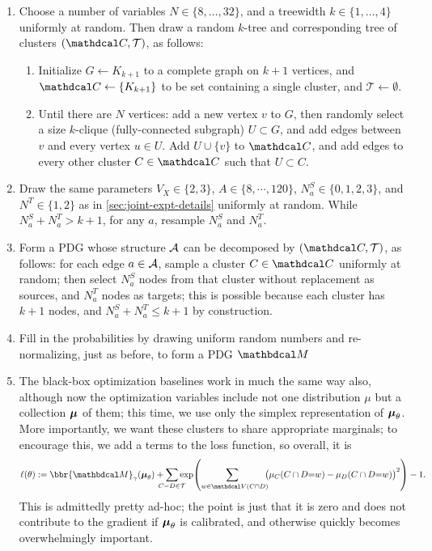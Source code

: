 \begin{subappendices}
\begin{enumerate}
    \item Choose a number of variables $N \in \{ 8, \ldots, 32 \}$, and a treewidth $k \in \{1, \ldots, 4\}$ uniformly at random.
    Then draw a random $k$-tree and corresponding tree of clusters $(\C, \mathcal T)$, as follows:
    \begin{enumerate}
        \item Initialize $G \gets K_{k+1}$ to a complete graph on $k+1$ vertices, and $\C \gets\{ K_{k+1} \}$ to be set containing a single cluster, and $\mathcal T\gets \emptyset$.
        \item Until there are $N$ vertices: add a new vertex $v$ to $G$, then randomly select a size $k$-clique (fully-connected subgraph) $U \subset G$, and add edges between $v$ and every vertex $u \in U$.
        Add $U \cup \{v\}$ to $\C$, and add edges to every other cluster $C \in \C$ such that $U \subset C$.
    \end{enumerate}
    \item Draw the same parameters $V_X \in \{2,3\}$, $A \in \{8, \cdots, 120\}$, $N_a^S \in \{0,1,2,3\}$, and $N^{T}\in \{1,2\}$
    as in \cref{sec:joint-expt-details} uniformly at random.
    While $N_a^S + N^T_a > k+1$, for any $a$, resample $N_a^S$ and $N_a^T$.

    \item Form a PDG whose structure $\mathcal A$ can be decomposed by $(\C, \cal T)$, as follows:
    for each edge $a \in \mathcal A$, sample a cluster $C \in \C$ uniformly at random; then select $N_a^S$ nodes from that cluster without replacement as sources, and $N_a^T$ nodes as targets; this is possible because each cluster has $k+1$ nodes, and $N_a^S + N_a^T \le k+1$ by construction.
    \item Fill in the probabilities by drawing uniform random numbers and re-normalizing, just as before, to form a PDG $\dg M$

    \item The black-box optimization baselines work in much the same way also, although now the optimization variables include not one distribution $\mu$ but a collection $\boldsymbol\mu$ of them;
    this time, we use only the simplex representation of $\boldsymbol\mu_\theta$.
    More importantly, we want these clusters to share appropriate marginals; to encourage this, we add a terms to the loss function, so overall, it is
    \[
        \ell(\theta) := \bbr{\dg M}_{\gamma}(\bmu_{\theta})  + \sum_{\mathclap{C{-}D \in \mathcal T}}\exp \!\left(\sum_{w \in \V(C\cap D)\!\!\!\!} \big(\mu_C(C\cap D{=}w) - \mu_D(C \cap D {=}w)\big)^2 \right) - 1.
    \]
    This is admittedly pretty ad-hoc; the point is just that it is zero and does not contribute to the gradient if $\boldsymbol\mu_\theta$ is calibrated, and otherwise quickly becomes overwhelmingly important.
\end{enumerate}


\end{subappendices}

